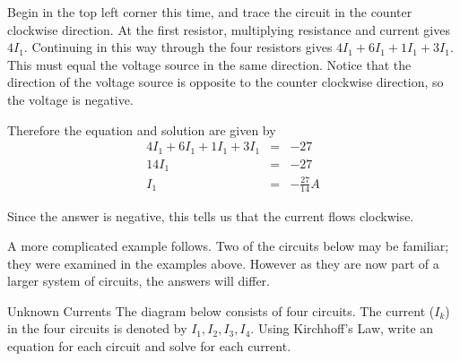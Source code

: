\begin{solution}
Begin in the top left corner this time, and trace the circuit in the counter clockwise direction. At the first resistor, multiplying resistance and current gives $4I_1$. Continuing in this way through the four resistors gives $4I_1 + 6I_1 + 1 I_1 + 3I_1$. This must equal the voltage source in the same direction. Notice that the direction of the voltage source is opposite to the counter clockwise direction, so the voltage is negative. 

Therefore the equation and solution are given by
\begin{eqnarray*}
4I_1 + 6I_1 + 1 I_1 + 3I_1&=& -27 \\
14I_1 &=& -27 \\
I_1 &=& -\frac{27}{14} A
\end{eqnarray*}

Since the answer is negative, this tells us that the current flows clockwise. 
\end{solution}

A more complicated example follows. Two of the circuits below may be familiar; they were examined in the examples above. However as they are now part of a larger system of circuits, the answers will differ. 

\begin{example}{Unknown Currents}\label{exa:unknowncurrent}
The diagram below consists of four circuits. The current ($I_k$) in the four circuits is denoted by $I_{1},I_{2},I_{3},I_{4}$. Using Kirchhoff's Law, write an equation for each circuit and solve for each current.
\end{example}

